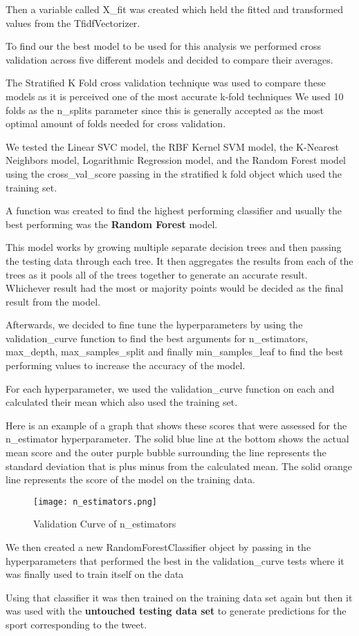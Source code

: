 \documentclass{article}
\begin{document}
\begin{enumerate}
    Then a variable called X\_fit was created which held the fitted and transformed values from the TfidfVectorizer.

    To find our the best model to be used for this analysis we performed cross validation across five different models and decided to compare their averages. 


    The Stratified K Fold cross validation technique was used to compare these models as it is perceived one of the most accurate k-fold techniques We used 10 folds as the n\_splits parameter since this is generally accepted as the most optimal amount of folds needed for cross validation.

    We tested the Linear SVC model, the RBF Kernel SVM model, the K-Nearest Neighbors model, Logarithmic Regression model, and the Random Forest model using the cross\_val\_score passing in the stratified k fold object which used the training set.

    A function was created to find the highest performing classifier and usually the best performing was the \textbf{Random Forest} model. 

    This model works by growing multiple separate decision trees and then passing the testing data through each tree. It then aggregates the results from each of the trees as it pools all of the trees together to generate an accurate result. Whichever result had the most or majority points would be decided as the final result from the model.

    Afterwards, we decided to fine tune the hyperparameters by using the validation\_curve function to find the best arguments for n\_estimators, max\_depth, max\_samples\_split and finally min\_samples\_leaf to find the best performing values to increase the accuracy of the model.

    For each hyperparameter, we used the validation\_curve function on each and calculated their mean which also used the training set.

    Here is an example of a graph that shows these scores that were assessed for the n\_estimator hyperparameter. The solid blue line at the bottom shows the actual mean score and the outer purple bubble surrounding the line represents the standard deviation that is plus minus from the calculated mean. The solid orange line represents the score of the model on the training data. 

\begin{figure}[ht!]
    \centering
    \texttt{[image: n\_estimators.png]}    \caption{Validation Curve of n\_estimators}
    \label{f:n_estimators}
\end{figure}

    We then created a new RandomForestClassifier object by passing in the hyperparameters that performed the best in the validation\_curve tests where it was finally used to train itself on the data

    Using that classifier it was then trained on the training data set again but then it was used with the \textbf{untouched testing data set} to generate predictions for the sport corresponding to the tweet.
    
\end{enumerate}
\end{document}
